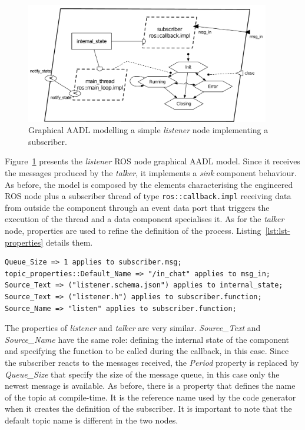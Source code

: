 \begin{figure}[t]
\centering
\includegraphics[width=0.95\textwidth]{gfx/usecase-subscriber}
\caption{Graphical AADL modelling a simple \textit{listener} node implementing a subscriber.}\label{fig:usecase-subscriber}
\end{figure}

Figure~\ref{fig:usecase-subscriber} presents the \textit{listener} ROS node graphical AADL model. Since it receives the messages produced by the \textit{talker}, it implements a \textit{sink} component behaviour. As before, the model is composed by the elements characterising the engineered ROS node plus a subscriber thread of type \texttt{ros::callback.impl} receiving data from outside the component through an event data port that triggers the execution of the thread and a data component specialises it. As for the \textit{talker} node, properties are used to refine the definition of the process. Listing~\ref{lst:lst-properties} details them.

\begin{lstlisting}[language=AADL,caption={Properties of the listener node.},label=lst:lst-properties]
Queue_Size => 1 applies to subscriber.msg;
topic_properties::Default_Name => "/in_chat" applies to msg_in;
Source_Text => ("listener.schema.json") applies to internal_state;
Source_Text => ("listener.h") applies to subscriber.function;
Source_Name => "listen" applies to subscriber.function;
\end{lstlisting}

The properties of \textit{listener} and \textit{talker} are very similar. \textit{Source\_Text} and \textit{Source\_Name} have the same role: defining the internal state of the component and specifying the function to be called during the callback, in this case. Since the subscriber reacts to the messages received, the \textit{Period} property is replaced by \textit{Queue\_Size} that specify the size of the message queue, in this case only the newest message is available. As before, there is a property that defines the name of the topic at compile-time. It is the reference name used by the code generator when it creates the definition of the subscriber. It is important to note that the default topic name is different in the two nodes.

